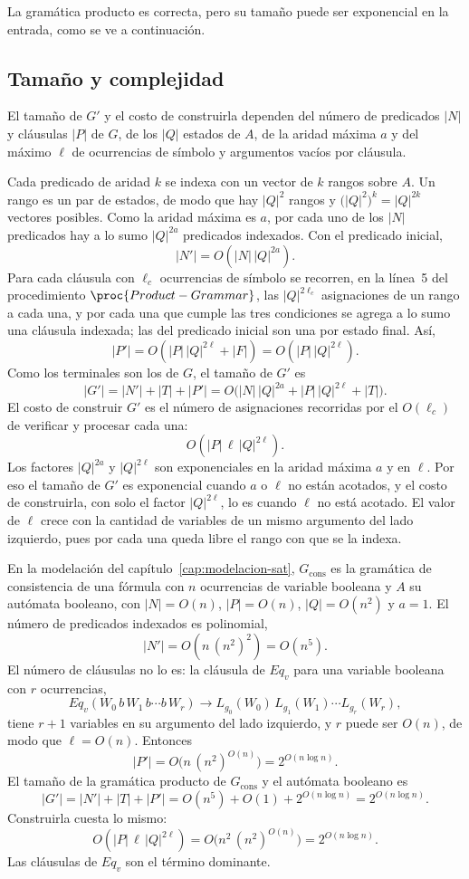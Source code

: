 \documentclass{report}
\theoremstyle{definition}
\theoremstyle{plain}
\begin{document}
La gramática producto es correcta, pero su tamaño puede ser exponencial
en la entrada, como se ve a continuación.

\subsection{Tamaño y complejidad}

El tamaño de $G'$ y el costo de construirla dependen del número de
predicados $|N|$ y cláusulas $|P|$ de $G$, de los $|Q|$ estados de $A$,
de la aridad máxima $a$ y del máximo $\ell$ de ocurrencias de símbolo y
argumentos vacíos por cláusula.

Cada predicado de aridad $k$ se indexa con un vector de $k$ rangos sobre
$A$. Un rango es un par de estados, de modo que hay $|Q|^2$ rangos y
$\bigl(|Q|^2\bigr)^k = |Q|^{2k}$ vectores posibles. Como la aridad máxima
es $a$, por cada uno de los $|N|$ predicados hay a lo sumo $|Q|^{2a}$
predicados indexados. Con el predicado inicial,
\[
  |N'| = O(|N|\,|Q|^{2a}).
\]
Para cada cláusula con $\ell_c$ ocurrencias de símbolo se recorren, en la
línea~5 del procedimiento $\proc{Product-Grammar}$, las $|Q|^{2\ell_c}$
asignaciones de un rango a cada una, y por cada una que
cumple las tres condiciones se agrega a lo sumo una cláusula indexada;
las del predicado inicial son una por estado final. Así,
\[
  |P'| = O(|P|\,|Q|^{2\ell} + |F|) = O(|P|\,|Q|^{2\ell}).
\]
Como los terminales son los de $G$, el tamaño de $G'$ es
\[
  |G'| = |N'| + |T| + |P'| = O\bigl(|N|\,|Q|^{2a} + |P|\,|Q|^{2\ell} + |T|\bigr).
\]
El costo de construir $G'$ es el número de asignaciones recorridas por el
$O(\ell_c)$ de verificar y procesar cada una:
\[
  O(|P|\,\ell\,|Q|^{2\ell}).
\]
Los factores $|Q|^{2a}$ y $|Q|^{2\ell}$ son exponenciales en la aridad
máxima $a$ y en $\ell$. Por eso el tamaño de $G'$ es exponencial cuando
$a$ o $\ell$ no están acotados, y el costo de construirla, con solo el
factor $|Q|^{2\ell}$, lo es cuando $\ell$ no está acotado. El valor de
$\ell$ crece con la cantidad de variables de un mismo argumento del lado
izquierdo, pues por cada una queda libre el rango con que se la indexa.

En la modelación del capítulo~\ref{cap:modelacion-sat}, $G_{\mathrm{cons}}$
es la gramática de consistencia de una fórmula con $n$ ocurrencias de
variable booleana y $A$ su autómata booleano, con $|N| = O(n)$,
$|P| = O(n)$,
$|Q| = O(n^2)$ y $a = 1$. El número de predicados indexados es
polinomial,
\[
  |N'| = O(n\,(n^2)^2) = O(n^5).
\]
El número de cláusulas no lo es: la cláusula de $Eq_v$ para una variable
booleana con $r$ ocurrencias,
\[
  Eq_v(W_0\,b\,W_1\,b \cdots b\,W_r) \to L_{g_0}(W_0)\,L_{g_1}(W_1) \cdots L_{g_r}(W_r),
\]
tiene $r+1$ variables en su argumento del lado izquierdo, y $r$ puede ser
$O(n)$, de modo que $\ell = O(n)$. Entonces
\[
  |P'| = O\bigl(n\,(n^2)^{O(n)}\bigr) = 2^{O(n \log n)}.
\]
El tamaño de la gramática producto de $G_{\mathrm{cons}}$ y el autómata
booleano es
\[
  |G'| = |N'| + |T| + |P'| = O(n^5) + O(1) + 2^{O(n\log n)} = 2^{O(n\log n)}.
\]
Construirla cuesta lo mismo:
\[
  O(|P|\,\ell\,|Q|^{2\ell}) = O\bigl(n^2\,(n^2)^{O(n)}\bigr) = 2^{O(n\log n)}.
\]
Las cláusulas de $Eq_v$ son el término dominante.
\end{document}
